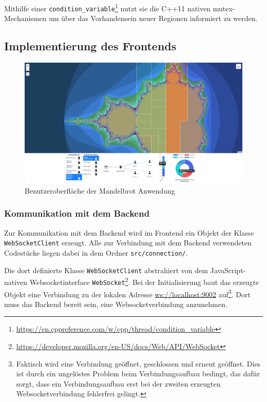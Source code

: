 Mithilfe einer \texttt{condition\_variable}\footnote{\url{https://en.cppreference.com/w/cpp/thread/condition_variable}}
nutzt sie die C++11 nativen mutex-Mechanismen um über das Vorhandensein neuer Regionen informiert zu werden.

\subsection{Implementierung des Frontends}

\begin{figure}[h!]
	\centering
	\includegraphics[width=\linewidth]{img/Implementierung/UI-Screenshot}
	\caption{Benutzeroberfläche der Mandelbrot Anwendung}
	\label{fig:ui-screenshot}
\end{figure}

\subsubsection{Kommunikation mit dem Backend}\label{sec:fontend_communication}

Zur Kommunikation mit dem Backend wird im Frontend ein Objekt der Klasse \verb|WebSocketClient| erzeugt.
Alle zur Verbindung mit dem Backend verwendeten Codestücke liegen dabei in dem Ordner \verb|src/connection/|.

Die dort definierte Klasse \verb|WebSocketClient| abstrahiert von dem JavaScript-nativen Websocketinterface \verb|WebSocket|\footnote{\url{https://developer.mozilla.org/en-US/docs/Web/API/WebSocket}}.
Bei der Initialisierung baut das erzeugte Objekt eine Verbindung zu der lokalen Adresse \url{ws://localhost:9002} auf\footnote{
	Faktisch wird eine Verbindung geöffnet, geschlossen und erneut geöffnet.
	Dies ist durch ein ungelöstes Problem beim Verbindungsaufbau bedingt, das dafür sorgt, dass ein Verbindungsaufbau
	erst bei der zweiten erzeugten Websocketverbindung fehlerfrei gelingt.
}.
Dort muss das Backend bereit sein, eine Websocketverbindung anzunehmen.

